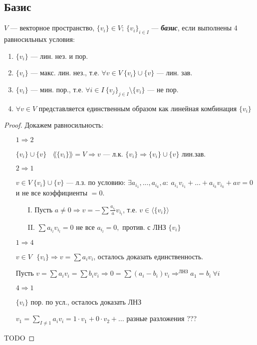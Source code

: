 \subsection{Базис}

\begin{definition}
    $V$ — векторное пространство, $\{v_i\}\in V;\ \{v_i\}_{i\in I}$ — 
\textbf{\textit{базис}}, если выполнены 4 равносильных условия:
    \begin{enumerate}
        \item $\{v_i\}$ — лин. нез. и пор.
        \item $\{v_i\}$ — макс. лин. нез., т.е. $\forall v\in V\ 
\{v_i\}\cup\{v\}$ — лин. зав.
        \item $\{v_i\}$ — мин. пор., т.е. $\forall i\in I\ \{v_j\}_{j\in 
I}\setminus\{v_i\}$ — не пор.
        \item $\forall v\in V$ представляется единственным образом как 
линейная комбинация $\{v_i\}$ 
    \end{enumerate}
\end{definition}

\begin{proof} Докажем равносильность:
    \begin{enumerate}
        \item[\circ] $1\Rightarrow 2$ 
        
        $\{v_i\}\cup\{v\}\ \ \ \ \lang\{v_i\}\rang =V\Rightarrow v$ — л.к. 
$\{v_i\}\Rightarrow \{v_i\}\cup\{v\}$ лин.зав.
        \item[\circ] $2\Rightarrow 1$ 
        
        $v\in V\ \{v_i\}\cup\{v\}$ — л.з. по условию: $\exists 
a_{i_1},...,a_{i_k},a:\ a_{i_1}v_{i_1}+...+a_{i_k}v_{i_k}+av=0$ и не все 
коэффициенты $=0$.
        \begin{enumerate}
            \item[I.] Пусть $a\neq 0\Rightarrow v=-\sum 
\frac{a_{i_l}}{a}v_{i_l}$, т.е. $v\in\langle \{v_i\}\rangle$
            \item[II.] $\sum a_{i_l}v_{i_l}=0$ не все $a_{i_l}=0,$ против. 
с ЛНЗ $\{v_i\}$
        \end{enumerate}
        \item[\circ] $1\Rightarrow 4$ 
        
        $v\in V\ \ \ \{v_i\}\Rightarrow v=\sum a_iv_i$, осталось доказать 
единственность.
        
        Пусть $v=\sum a_iv_i=\sum b_iv_i\Rightarrow 0=\sum 
(a_i-b_i)v_i\Rightarrow^{\text{ЛНЗ}}a_1=b_i\ \forall i$
        \item[\circ] $4\Rightarrow 1$ 
        
        $\{v_i\}$ пор. по усл., осталось доказать ЛНЗ 
        
        $v_1=\sum\limits_{I\neq 1} a_iv_i=1\cdot v_1+0\cdot v_2+...$ 
разные разложения ???
    \end{enumerate}
TODO
\end{proof}



